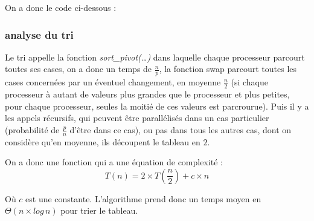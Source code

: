 On a donc le code ci-dessous :


\cleardoublepage


\cleardoublepage
\subsubsection*{analyse du tri}
Le tri appelle la fonction \textit{sort\_pivot(\dots)} dans laquelle chaque processeur parcourt toutes ses cases, on a donc un temps de $\frac{n}{p}$, la fonction swap parcourt toutes les cases concernées par un éventuel changement, en moyenne $\frac{n}{2}$ (si chaque processeur à autant de valeurs plus grandes que le processeur et plus petites, pour chaque processeur, seules la moitié de ces valeurs est parcrourue). Puis il y a les appels récursifs, qui peuvent être parallélisés dans un cas particulier (probabilité de $\frac{p}{n}$ d'être dans ce cas), ou pas dans tous les autres cas, dont on considère qu'en moyenne, ils découpent le tableau en $2$. 

On a donc une fonction qui a une équation de complexité : 
$$T(n) = 2 \times T(\frac{n}{2}) + c \times n$$

Où $c$ est une constante. L'algorithme prend donc un temps moyen en $\Theta (n \times log \, n)$ pour trier le tableau.








